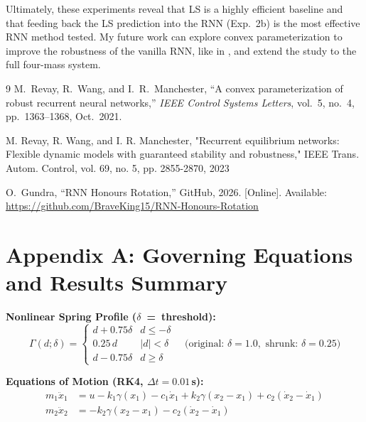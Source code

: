 \documentclass[12pt]{article}
\begin{document}
Ultimately, these experiments reveal that LS is a highly efficient baseline and that feeding back the LS prediction into the RNN (Exp.~2b) is the most effective RNN method tested. My future work can explore convex parameterization to improve the robustness of the vanilla RNN, like in \cite{revay2021}, and extend the study to the full four-mass system.

\newpage
\begin{thebibliography}{9}
\setlength{\itemsep}{2pt}
\setlength{\parsep}{0pt}
  M.~Revay, R.~Wang, and I.~R.~Manchester,
  ``A convex parameterization of robust recurrent neural networks,''
  \textit{IEEE Control Systems Letters}, vol.~5, no.~4, pp.~1363--1368, Oct.~2021.

  M. Revay, R. Wang, and I. R. Manchester, "Recurrent equilibrium networks: Flexible dynamic models with guaranteed stability and robustness," IEEE Trans. Autom. Control, vol. 69, no. 5, pp. 2855-2870, 2023

  O.~Gundra, ``RNN Honours Rotation,'' GitHub, 2026. [Online].
  Available: \url{https://github.com/BraveKing15/RNN-Honours-Rotation}
\end{thebibliography}

\newpage
\section*{Appendix A: Governing Equations and Results Summary}

\noindent\textbf{Nonlinear Spring Profile ($\delta$~=~threshold):}
\begin{equation}
  \Gamma(d;\delta) =
  \begin{cases}
    d + 0.75\delta & d \leq -\delta \\
    0.25\,d        & |d| < \delta   \\
    d - 0.75\delta & d \geq \delta
  \end{cases}
  \quad\text{(original: }\delta{=}1.0,\text{ shrunk: }\delta{=}0.25\text{)}
\end{equation}

\noindent\textbf{Equations of Motion (RK4, $\Delta t=0.01$\,s):}
\begin{align}
  m_1\ddot{x}_1 &= u - k_1\gamma(x_1) - c_1\dot{x}_1 + k_2\gamma(x_2-x_1) + c_2(\dot{x}_2-\dot{x}_1) \\
  m_2\ddot{x}_2 &= -k_2\gamma(x_2-x_1) - c_2(\dot{x}_2-\dot{x}_1)
\end{align}
\end{document}
